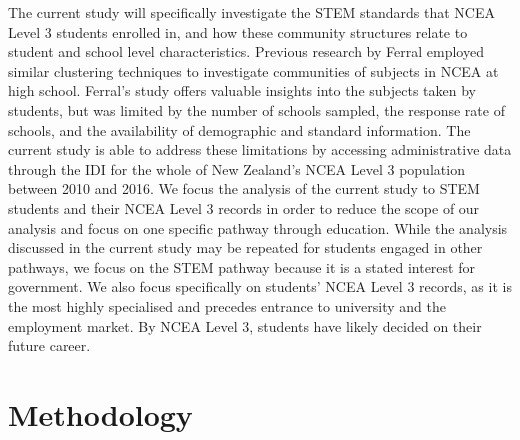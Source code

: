\documentclass[a4paper]{article}
\begin{document}
The current study will specifically investigate the STEM standards that NCEA Level 3 students enrolled in, and how these community structures relate to student and school level characteristics. Previous research by Ferral \cite{ferral2005clustering} employed similar clustering techniques to investigate communities of subjects in NCEA at high school. Ferral's study offers valuable insights into the subjects taken by students, but was limited by the number of schools sampled, the response rate of schools, and the availability of demographic and standard information. The current study is able to address these limitations by accessing administrative data through the IDI for the whole of New Zealand's NCEA Level 3 population between 2010 and 2016. We focus the analysis of the current study to STEM students and their NCEA Level 3 records in order to reduce the scope of our analysis and focus on one specific pathway through education. While the analysis discussed in the current study may be repeated for students engaged in other pathways, we focus on the STEM pathway because it is a stated interest for government. We also focus specifically on students' NCEA Level 3 records, as it is the most highly specialised and precedes entrance to university and the employment market. By NCEA Level 3, students have likely decided on their future career.

\section{Methodology}
\end{document}
